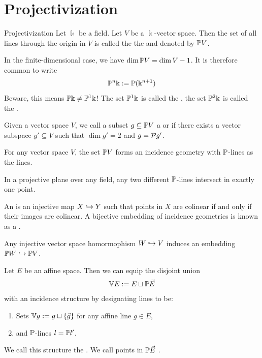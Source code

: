 \section{Projectivization}
\begin{importantdefinition}{Projectivization}{}
	Let $\Bbbk$ be a field. Let $V$ be a $\Bbbk$-vector space. Then the set of all lines through the origin in $V$ is called the the  and denoted by $\mathbb{P} V$.
\end{importantdefinition}
In the finite-dimensional case, we have $\dim \mathbb{P} V = \dim V - 1$. It is therefore common to write
\begin{align*}
	\mathbb{P}^n \Bbbk := \mathbb{P}(\Bbbk^{n+1})
\end{align*} 
Beware, this means $\mathbb{P} \Bbbk \neq \mathbb{P}^1 \Bbbk$! The set $\mathbb{P}^1 \Bbbk$ is called the , the set $\mathbb{P}^2 \Bbbk$ is called the .
\begin{definition}
	Given a vector space $V$, we call a subset $g \subseteq \mathbb{P} V$ a  or  if there exists a vector subspace $g' \subseteq V$ such that $\dim g' = 2$ and $g = \mathcal{P} g'$.
\end{definition}
\begin{lemma}
	For any vector space $V$, the set $\mathbb{P} V$ forms an incidence geometry with $\mathbb{P}$-lines as the lines.
\end{lemma}
\begin{lemma}
	In a projective plane over any field, any two different $\mathbb{P}$-lines intersect in exactly one point.
\end{lemma}
\begin{definition}
	An  is an injective map $X \hookrightarrow Y$ such that points in $X$ are colinear if and only if their images are colinear. A bijective embedding of incidence geometries is known as a .
\end{definition}
\begin{lemma}
	Any injective vector space homormophism $W \hookrightarrow V$ induces an embedding $\mathbb{P} W \hookrightarrow \mathbb{P} V$.
\end{lemma}
\begin{importantdefinition}{}{}
	Let $E$ be an affine space. Then we can equip the disjoint union
	\begin{align*}
		\mathbb{V} E := E \sqcup \mathbb{P} \vec{E}
	\end{align*}
	with an incidence structure by designating lines to be:
	\begin{enumerate}
		\item Sets $ \mathbb{V} g := g \sqcup \qty{\vec{g}}$ for any affine line $g \in E$,
		\item and $\mathbb{P}$-lines $l = \mathbb{P} l'$.
	\end{enumerate}  
	 We call this structure the . We call points in $\mathbb{P} \vec{E}$ .
\end{importantdefinition}
